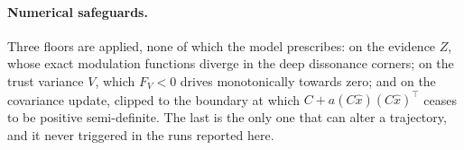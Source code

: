\documentclass{article}
\newcommand{\FV}{F_{V}}
\begin{document}
\paragraph{Numerical safeguards.} Three floors are applied, none of which the
model prescribes: on the evidence $Z$, whose exact modulation functions diverge
in the deep dissonance corners; on the trust variance $V$, which $\FV<0$
drives monotonically towards zero; and on the covariance update, clipped to the
boundary at which $C+a(C\hat{x})(C\hat{x})^{\!\top}$ ceases to be positive
semi-definite. The last is the only one that can alter a trajectory, and it never
triggered in the runs reported here.
\end{document}

